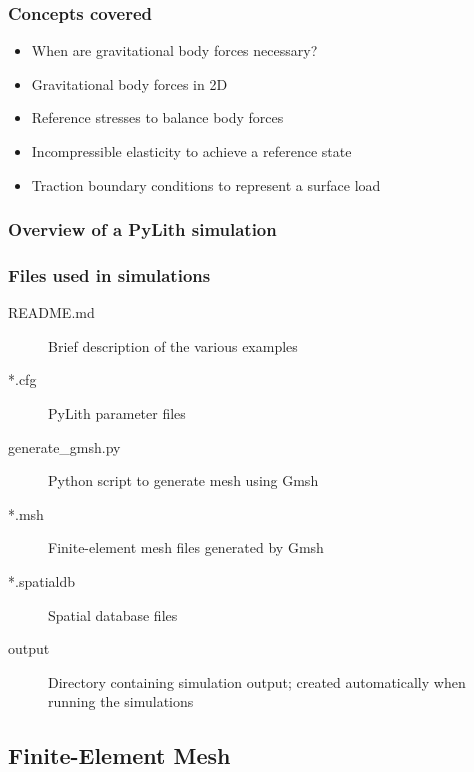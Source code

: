 \documentclass[aspectratio=169]{beamer}
\begin{document}
\begin{frame}
  \frametitle{Concepts covered}
  \summary{}

  \begin{itemize}
  \item When are gravitational body forces necessary?
  \item Gravitational body forces in 2D
  \item Reference stresses to balance body forces
  \item Incompressible elasticity to achieve a reference state
  \item Traction boundary conditions to represent a surface load
  \end{itemize}
  
\end{frame}


\begin{frame}
  \frametitle{Overview of a PyLith simulation}
  \summary{}

  
\end{frame}


\begin{frame}
  \frametitle{Files used in simulations}

  \begin{description}
  \item[README.md] Brief description of the various examples
  \item[*.cfg] PyLith parameter files
  \item[generate\_gmsh.py] Python script to generate mesh using Gmsh
  \item[*.msh] Finite-element mesh files generated by Gmsh
  \item[*.spatialdb] Spatial database files
  \item[output] Directory containing simulation output; created automatically when running the simulations
  \end{description}

\end{frame}


\subsection{Finite-Element Mesh}
\end{document}
